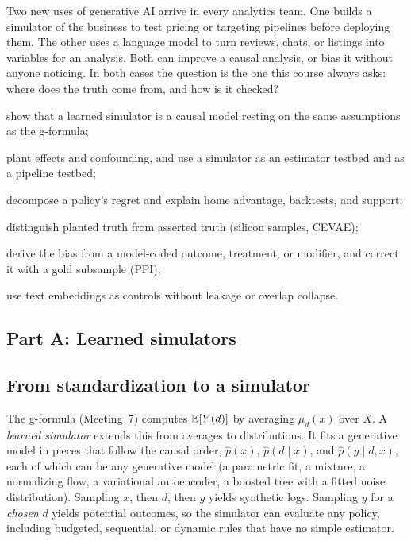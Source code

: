 \documentclass[11pt]{article}
\begin{document}

\begin{decision}
Two new uses of generative AI arrive in every analytics team. One builds a simulator of the business to test pricing or
targeting pipelines before deploying them. The other uses a language model to turn reviews, chats, or listings into variables
for an analysis. Both can improve a causal analysis, or bias it without anyone noticing. In both cases the question is the one this course
always asks: where does the truth come from, and how is it checked?
\end{decision}

\begin{goals}
  \item show that a learned simulator is a causal model resting on the same assumptions as the g-formula;
  \item plant effects and confounding, and use a simulator as an estimator testbed and as a pipeline testbed;
  \item decompose a policy's regret and explain home advantage, backtests, and support;
  \item distinguish planted truth from asserted truth (silicon samples, CEVAE);
  \item derive the bias from a model-coded outcome, treatment, or modifier, and correct it with a gold subsample (PPI);
  \item use text embeddings as controls without leakage or overlap collapse.
\end{goals}

\sectionone

\subsection*{Part A: Learned simulators}

\subsection{From standardization to a simulator}

The g-formula (Meeting~7) computes $\mathbb{E}[Y(d)]$ by averaging $\mu_d(x)$ over $X$. A \emph{learned simulator} extends this from averages
to distributions. It fits a generative model in pieces that follow the causal order, $\hat p(x)$, $\hat p(d \mid x)$, and
$\hat p(y \mid d, x)$, each of which can be any generative model (a parametric fit, a mixture, a normalizing flow, a variational
autoencoder, a boosted tree with a fitted noise distribution). Sampling $x$, then $d$, then $y$ yields synthetic logs. Sampling $y$ for a
\emph{chosen} $d$ yields potential outcomes, so the simulator can evaluate any policy, including budgeted, sequential, or dynamic
rules that have no simple estimator.
\end{document}

